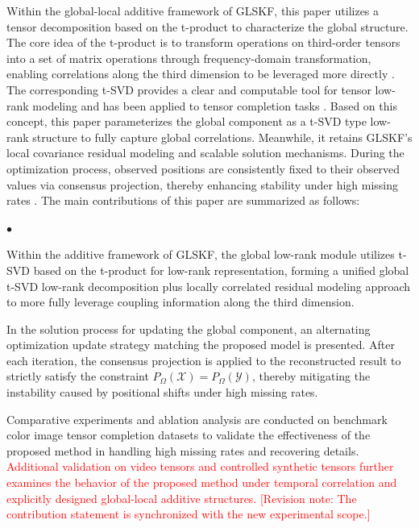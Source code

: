 \documentclass[a4paper,12pt]{article}
\numberwithin{equation}{section}
\numberwithin{algorithm}{section}
\newcommand{\rev}[1]{\textcolor{red}{#1}}
\newcommand{\revnote}[1]{\textcolor{red}{[Revision note: #1]}}
\theoremstyle{remark}
\theoremstyle{definition}
\begin{document}
Within the global-local additive framework of GLSKF, this paper utilizes a tensor decomposition based on the t-product to characterize the global structure. The core idea of the t-product is to transform operations on third-order tensors into a set of matrix operations through frequency-domain transformation, enabling correlations along the third dimension to be leveraged more directly \cite{kilmer2011factorization, kilmer2013operators}. The corresponding t-SVD provides a clear and computable tool for tensor low-rank modeling and has been applied to tensor completion tasks \cite{zhang2017tsvd}. Based on this concept, this paper parameterizes the global component as a t-SVD type low-rank structure to fully capture global correlations. Meanwhile, it retains GLSKF's local covariance residual modeling and scalable solution mechanisms. During the optimization process, observed positions are consistently fixed to their observed values via consensus projection, thereby enhancing stability under high missing rates \cite{boyd2011admm}.
The main contributions of this paper are summarized as follows:
	\begin{list}{$\bullet$}
		{\setlength{\parsep}{\parskip}
		\setlength{\itemsep}{0ex plus 0.1ex}
		\setlength{\topsep}{0pt}
	    }
	\item Within the additive framework of GLSKF, the global low-rank module utilizes  t-SVD based on the  t-product for low-rank representation, forming a unified global  t-SVD low-rank decomposition plus locally correlated residual modeling approach to more fully leverage coupling information along the third dimension.
	\item In the solution process for updating the global component, an alternating optimization update strategy matching the proposed model is presented. After each iteration, the consensus projection is applied to the reconstructed result to strictly satisfy the constraint $P_{\Omega}(\mathcal{X})=P_{\Omega}(\mathcal{Y})$, thereby mitigating the instability caused by positional shifts under high missing rates.
	\item Comparative experiments and ablation analysis are conducted on benchmark color image tensor completion datasets to validate the effectiveness of the proposed method in handling high missing rates and recovering details. \rev{Additional validation on video tensors and controlled synthetic tensors further examines the behavior of the proposed method under temporal correlation and explicitly designed global-local additive structures.} \revnote{The contribution statement is synchronized with the new experimental scope.}
\end{list}
\end{document}
